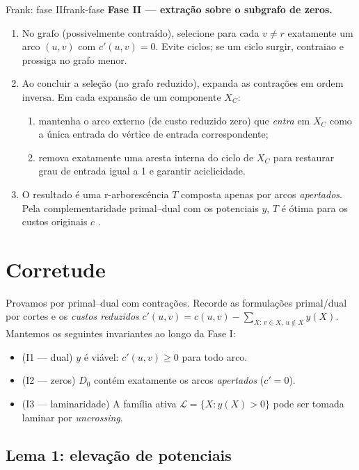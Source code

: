 \begin{algobox}{Frank: fase II}{frank-fase}
	\textbf{Fase II — extração sobre o subgrafo de zeros.}
	\begin{enumerate}\setlength{\itemsep}{1pt}
		\item No grafo (possivelmente contraído), selecione para cada \(v\neq r\) exatamente um arco \((u,v)\) com \(c'(u,v)=0\). Evite ciclos; se um ciclo surgir, contraia\-o e prossiga no grafo menor.
		\item Ao concluir a seleção (no grafo reduzido), expanda as contrações em ordem inversa. Em cada expansão de um componente \(X_C\):
		      \begin{enumerate}\setlength{\itemsep}{1pt}
			      \item mantenha o arco externo (de custo reduzido zero) que \emph{entra} em \(X_C\) como a única entrada do vértice de entrada correspondente;
			      \item remova exatamente uma aresta interna do ciclo de \(X_C\) para restaurar grau de entrada igual a 1 e garantir aciclicidade.
		      \end{enumerate}
		\item O resultado é uma r-arborescência \(T\) composta apenas por arcos \emph{apertados}. Pela complementaridade primal–dual com os potenciais \(y\), \(T\) é ótima para os custos originais \(c\) \cite{frank2014,schrijver2003comb}.
	\end{enumerate}
\end{algobox}

\section{Corretude}

Provamos por primal–dual com contrações. Recorde as formulações primal/dual por cortes e os \emph{custos reduzidos} \(c'(u,v)=c(u,v)-\sum_{X:\,v\in X,\ u\notin X} y(X)\). Mantemos os seguintes invariantes ao longo da Fase I:
\begin{itemize}\setlength{\itemsep}{2pt}
	\item (I1 — dual) \(y\) é viável: \(c'(u,v)\ge 0\) para todo arco.
	\item (I2 — zeros) \(D_0\) contém exatamente os arcos \emph{apertados} (\(c'=0\)).
	\item (I3 — laminaridade) A família ativa \(\mathcal{L}=\{X: y(X)>0\}\) pode ser tomada laminar por \emph{uncrossing}.
\end{itemize}

\subsection{Lema 1: elevação de potenciais}


